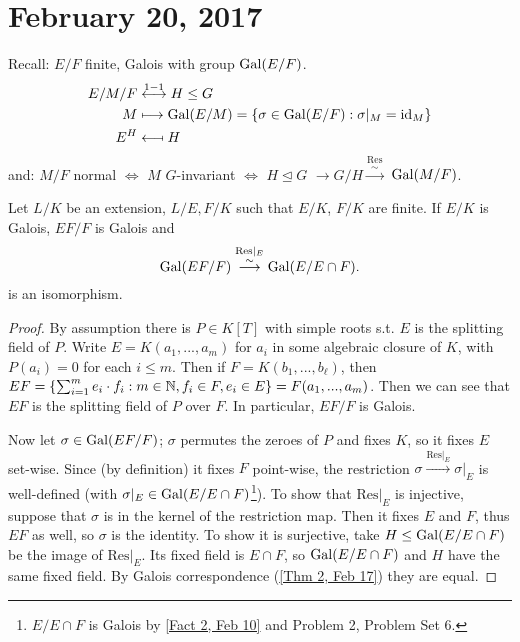 \section{February 20, 2017}

\noindent Recall: $E/F$ finite, Galois with group $\operatorname{Gal}(E/F)$.
\begin{align*}
	E/M/F &\stackrel{1-1}{\longleftrightarrow} H \leq G \\
	M & \longmapsto \operatorname{Gal}(E/M) = \{\sigma \in \operatorname{Gal}(E/F) : \sigma|_M = \text{id}_M\} \\
	E^H &\longmapsfrom H
\end{align*}
and: $M/F$ normal $\Leftrightarrow$ $M$ $G$-invariant $\Leftrightarrow$ $H \trianglelefteq G$ $\longrightarrow G/H \stackrel{\text{Res}}{\stackrel{\sim}{\rightarrow}}$ $\operatorname{Gal}(M/F)$.

\begin{prop} \label{Prop 1, Feb 20}
	Let $L/K$ be an extension, $L/E, F/K$ such that $E/K$, $F/K$ are finite. If $E/K$ is Galois, $EF/F$ is Galois and
		\[\operatorname{Gal}(EF/F) \stackrel{\text{Res}|_E}{\stackrel{\sim}{\longrightarrow}} \operatorname{Gal}(E/E \cap F).\]
	is an isomorphism.
\end{prop}

\begin{proof}
	By assumption there is $P \in K[T]$ with simple roots s.t. $E$ is the splitting field of $P$. Write $E = K(a_1, ..., a_m)$ for $a_i$ in some algebraic closure of $K$, with $P(a_i) = 0$ for each $i \leq m$. Then if $F = K(b_1, ..., b_{\ell})$, then $EF = \left\{ \sum_{i = 1}^m e_i \cdot f_i : m \in \mathbb{N}, f_i \in F, e_i \in E  \right\} = F(a_1, ..., a_m)$. Then we can see that $EF$ is the splitting field of $P$ over $F$. In particular, $EF/F$ is Galois.

	Now let $\sigma \in \operatorname{Gal}(EF/F)$; $\sigma$ permutes the zeroes of $P$ and fixes $K$, so it fixes $E$ set-wise. Since (by definition) it fixes $F$ point-wise, the restriction $\sigma \stackrel{\text{Res}|_E}{\longrightarrow} \sigma|_E$ is well-defined (with $\sigma|_E \in \operatorname{Gal}(E/E \cap F)$\footnote{$E/E \cap F$ is Galois by \ref{Fact 2, Feb 10} and Problem 2, Problem Set 6.}). To show that $\text{Res}|_E$ is injective, suppose that $\sigma$ is in the kernel of the restriction map. Then it fixes $E$ and $F$, thus $EF$ as well, so $\sigma$ is the identity. To show it is surjective, take $H \leq \operatorname{Gal}(E/E \cap F)$ be the image of $\text{Res}|_E$. Its fixed field is $E \cap F$, so $\operatorname{Gal}(E/E \cap F)$ and $H$ have the same fixed field. By Galois correspondence (\ref{Thm 2, Feb 17}) they are equal.
\end{proof}

